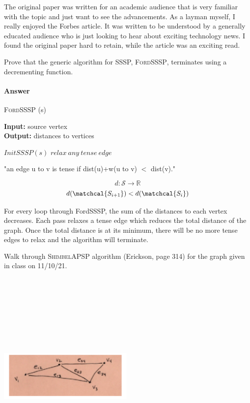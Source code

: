 \documentclass{article}
\begin{document}
The original paper was written for an academic audience that is very familiar with the topic and just want to see the advancements. As a layman myself, I really enjoyed the Forbes article. It was written to be understood by a generally educated audience who is just looking to hear about exciting technology news. I found the original paper hard to retain, while the article was an exciting read.

\collab{}

Prove that the generic algorithm for SSSP, \textsc{FordSSSP}, terminates using a
decrementing function.

\paragraph{Answer}

\begin{algorithm} \caption{\textsc{FordSSSP} (s)}\label{alg:seb}
    {\bf Input:} source vertex\\
    {\bf Output:} distances to vertices
    \begin{algorithmic}[1]
        \State$InitSSSP(s)$
            \State$relax\ any\ tense\ edge$
        \EndWhile\\
    \end{algorithmic}
\end{algorithm}

"an edge u to v is tense if dist(u)+w(u to v) $<$ dist(v)."

$$d : \mathcal{S} \rightarrow \mathbb{R}$$
$$d(\matchcal{S_{i+1}}) < d(\matchcal{S_i})$$

For every loop through FordSSSP, the sum of the distances to each vertex decreases.
Each pass relaxes a tense edge which reduces the total distance of the graph. Once
the total distance is at its minimum, there will be no more tense edges to relax
and the algorithm will terminate.

\collab{}

Walk through \textsc{ShimbelAPSP} algorithm (Erickson, page 314) for the graph given in class on
11/10/21.

\includegraphics[width=250,height=400,keepaspectratio]{432-111021-graph.png}
\end{document}
